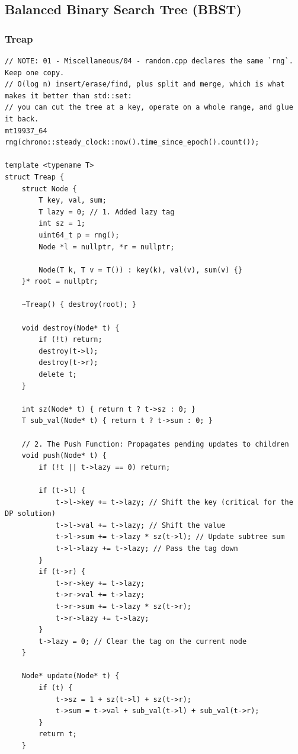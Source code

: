 \documentclass[9pt,a4paper,twocolumn]{extarticle}
\begin{document}
\subsection{Balanced Binary Search Tree (BBST)}

\filbreak
\subsubsection{Treap}
\nopagebreak
\begin{lstlisting}
// NOTE: 01 - Miscellaneous/04 - random.cpp declares the same `rng`. Keep one copy.
// O(log n) insert/erase/find, plus split and merge, which is what makes it better than std::set:
// you can cut the tree at a key, operate on a whole range, and glue it back.
mt19937_64 rng(chrono::steady_clock::now().time_since_epoch().count());

template <typename T>
struct Treap {
    struct Node {
        T key, val, sum;
        T lazy = 0; // 1. Added lazy tag
        int sz = 1;
        uint64_t p = rng();
        Node *l = nullptr, *r = nullptr;

        Node(T k, T v = T()) : key(k), val(v), sum(v) {}
    }* root = nullptr;

    ~Treap() { destroy(root); }

    void destroy(Node* t) {
        if (!t) return;
        destroy(t->l);
        destroy(t->r);
        delete t;
    }

    int sz(Node* t) { return t ? t->sz : 0; }
    T sub_val(Node* t) { return t ? t->sum : 0; }

    // 2. The Push Function: Propagates pending updates to children
    void push(Node* t) {
        if (!t || t->lazy == 0) return;

        if (t->l) {
            t->l->key += t->lazy; // Shift the key (critical for the DP solution)
            t->l->val += t->lazy; // Shift the value
            t->l->sum += t->lazy * sz(t->l); // Update subtree sum
            t->l->lazy += t->lazy; // Pass the tag down
        }
        if (t->r) {
            t->r->key += t->lazy;
            t->r->val += t->lazy;
            t->r->sum += t->lazy * sz(t->r);
            t->r->lazy += t->lazy;
        }
        t->lazy = 0; // Clear the tag on the current node
    }

    Node* update(Node* t) {
        if (t) {
            t->sz = 1 + sz(t->l) + sz(t->r);
            t->sum = t->val + sub_val(t->l) + sub_val(t->r);
        }
        return t;
    }


\end{lstlisting}
\end{document}
